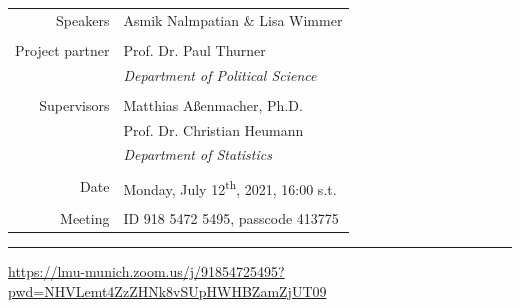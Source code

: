 \documentclass[12pt]{article}
\begin{document}
\begin{titlepage}
\begin{center}

\vspace{0.3cm}

\begin{tabular}{rl}
  Speakers & Asmik Nalmpatian \& Lisa Wimmer \\
  & \\
  Project partner & Prof. Dr. Paul Thurner \\
  & \textit{Department of Political Science} \\
  & \\
  Supervisors & Matthias Aßenmacher, Ph.D. \\
  & Prof. Dr. Christian Heumann \\
  & \textit{Department of Statistics} \\
  & \\
  Date & Monday, July 12\textsuperscript{th}, 2021, 16:00 s.t. \\
  & \\
  Meeting & ID 918 5472 5495, passcode 413775
\end{tabular}

\vspace{0.5cm}

\rule{\textwidth}{1pt}

\vspace{0.5cm}

\url{https://lmu-munich.zoom.us/j/91854725495?pwd=NHVLemt4ZzZHNk8vSUpHWHBZamZjUT09}

\end{center}
\end{titlepage}
\end{document}
